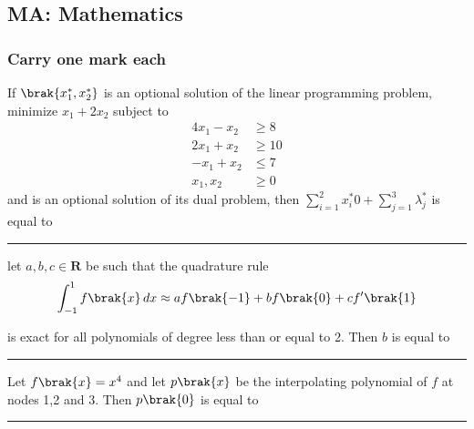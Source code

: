 \iffalse
\author{EE24BTECH11049}
\section{ma}
\chapter{2020}
\fi

\subsection{MA: Mathematics}
\subsubsection{Carry one mark each}
		\item 
		If $\brak{x_1^*, x_2^*}$ is an optional solution of the linear programming problem, minimize $x_1 + 2x_2$ subject to 
		\begin{align*}
			4x_1 - x_2 & \geq 8\\
			2x_1 + x_2 & \geq 10\\
			-x_1 + x_2 & \leq 7\\
			x_1, x_2 & \geq 0
		\end{align*}
		and  is an optional solution of its dual problem, then $\sum_{i = 1}^2 x_i^*0 + \sum_{j = 1}^3 \lambda_j^*$ is equal to \rule{2cm}{0.1pt} 
		
		\hfill{}

		\item 
		let $a, b, c \in \mathbf{R}$ be such that the quadrature rule 
		\begin{align*}
			\int_{-1}^1 f\brak{x}\, dx \approx af\brak{-1} + bf\brak{0} + cf^\prime\brak{1} 
		\end{align*}

		is exact for all polynomials of degree less than or equal to 2. Then $b$ is equal to \rule{2cm}{0.1pt} 
		
		\hfill{}

		\item 
		Let $f\brak{x} = x^4$ and let $p\brak{x}$ be the interpolating polynomial of $f$ at nodes 1,2 and 3. Then $p\brak{0}$ is equal to \rule{2cm}{0.1pt}
		
		\hfill{}

